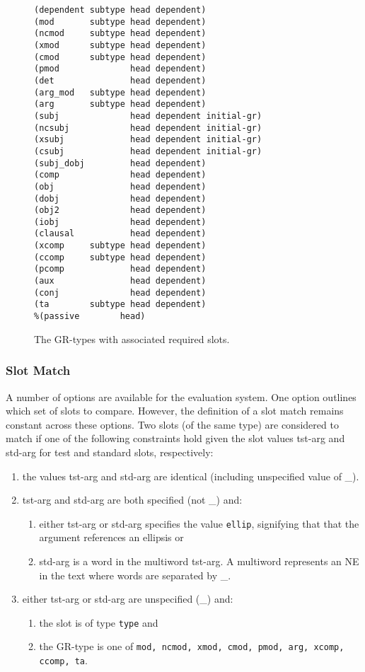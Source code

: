 \documentclass[10pt]{article}
\newcommand{\stt}[1]{{\small\texttt{#1}}}
\begin{document}
\begin{figure*}
{\small
\begin{center}
\begin{verbatim}
(dependent subtype head dependent)
(mod       subtype head dependent)
(ncmod     subtype head dependent)
(xmod      subtype head dependent)
(cmod      subtype head dependent)
(pmod              head dependent)
(det               head dependent)
(arg_mod   subtype head dependent)
(arg       subtype head dependent)
(subj              head dependent initial-gr)
(ncsubj            head dependent initial-gr)
(xsubj             head dependent initial-gr)
(csubj             head dependent initial-gr)
(subj_dobj         head dependent)
(comp              head dependent)
(obj               head dependent)
(dobj              head dependent)
(obj2              head dependent)
(iobj              head dependent)
(clausal           head dependent)
(xcomp     subtype head dependent)
(ccomp     subtype head dependent)
(pcomp             head dependent)
(aux               head dependent)
(conj              head dependent)
(ta        subtype head dependent)
%(passive        head)
\end{verbatim}
\end{center}}
\caption{The GR-types with associated required slots. }
\label{gr-slots}
\end{figure*}

\subsubsection{Slot Match}
\label{slotequality}

A number of options are available for the evaluation
system. One option outlines which set of slots to compare. However,
the definition of a slot match remains constant across 
these options.
Two slots (of the same type) are considered to match if
one of the following constraints hold given the slot values
tst-arg and std-arg for test and standard slots, respectively:
\begin{enumerate}
\item the values tst-arg and std-arg are identical (including
unspecified value of \_).
\item tst-arg and std-arg are both specified (not \_) and:
\begin{enumerate} 
\item either tst-arg or std-arg specifies the value
 \stt{ellip}, signifying that that the argument references an ellipsis or
\item{\label{NE-match} std-arg is a word in the multiword tst-arg. 
A multiword represents an NE in the text where words are separated
by \_.}
\end{enumerate} 
\item either tst-arg or std-arg are unspecified (\_) and:
\begin{enumerate}
\item the slot is of type \stt{type} and
\item the GR-type is one of 
\stt{mod, ncmod, xmod, cmod, pmod, arg, xcomp, ccomp, ta}.
\end{enumerate}
\end{enumerate}
\end{document}
